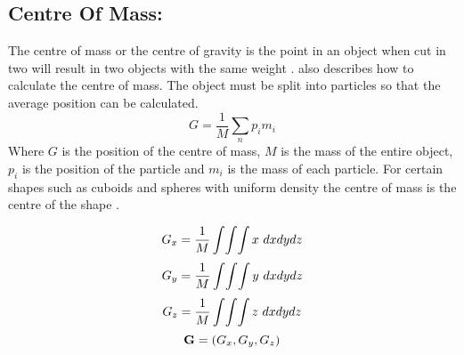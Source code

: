 \subsection{Centre Of Mass:}
The centre of mass or the centre of gravity is the point in an object when cut in two will result in two objects with the same weight \citep{millington2007game}. 
\citet{millington2007game} also describes how to calculate the centre of mass.
The object must be split into particles so that the average position can be calculated. 
\begin{equation}\label{Centre of Mass}
   G=\frac{1}{M}\sum _{n}{p}_{i}{m}_{i} 
\end{equation}
Where $G$ is the position of the centre of mass, $M$ is the mass of the entire object, ${p}_{i}$ is the position of the particle and ${m}_{i}$ is the mass of each particle.
For certain shapes such as cuboids and spheres with uniform density the centre of mass is the centre of the shape \citep{millington2007game}.

\begin{equation} \label{eq:Centre of Mass x-Component}
	\centering
   G_{x}=\frac{1}{M}\int\!\int\!\int x\ dx dy dz
\end{equation}
\begin{equation} \label{eq:Centre of Mass y-Component}
	\centering
   G_{y}=\frac{1}{M}\int\!\int\!\int y\ dx dy dz
\end{equation}
\begin{equation} \label{eq:Centre of Mass z-Component}
	\centering
   G_{z}=\frac{1}{M}\int\!\int\!\int z\ dx dy dz
\end{equation}
\begin{equation} \label{eq:Centre of Mass Equation}
	\centering
   \mathbf{G}=(G_{x},G_{y},G_{z})
\end{equation}